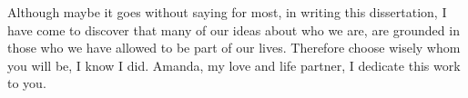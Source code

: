 \documentclass[phdthesis,12pt,final,a4paper]{wuthesis}
\theoremstyle{definition}
\theoremstyle{definition}
\theoremstyle{definition}
\theoremstyle{definition}
\theoremstyle{remark}
\begin{document}









\begin{thesistitlepage}
\end{thesistitlepage}

\setcounter{page}{0} %

\begin{thesiscopyrightpage}
\end{thesiscopyrightpage}

\cleardoublepage

\vspace*{\fill}

\noindent\thesiscommittee

\vspace*{10cm} %


\cleardoublepage
\begin{thesisdedicationpage}
Although maybe it goes without saying for most, in writing this dissertation, I have come to discover that many of our ideas about who we are, are grounded in those who we have allowed to be part of our lives. Therefore choose wisely whom you will be, I know I did. Amanda, my love and life partner, I dedicate this work to you.
\end{thesisdedicationpage}
\end{document}
